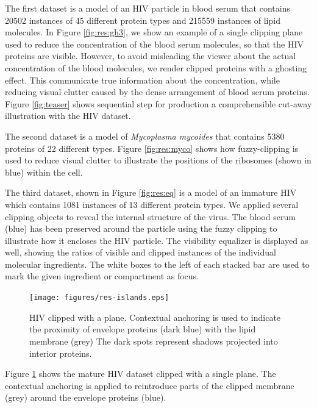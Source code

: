 The first dataset is a model of an HIV particle in blood serum that contains 20502 instances of 45 different protein types and 215559 instances of lipid molecules.
In Figure \ref{fig:res:gh3}, we show an example of a single clipping plane used to reduce the concentration of the blood serum molecules, so that the HIV proteins are visible. 
However, to avoid misleading the viewer about the actual concentration of the blood molecules, we render clipped proteins with a ghosting effect. 
This communicate true information about the concentration, while reducing visual clutter caused by the dense arrangement of blood serum proteins.
Figure \ref{fig:teaser} shows sequential step for production a comprehensible cut-away illustration with the HIV dataset.

The second dataset is a model of \emph{Mycoplasma mycoides} that contains 5380 proteins of 22 different types. 
Figure \ref{fig:res:myco} shows how fuzzy-clipping is used to reduce visual clutter to illustrate the positions of the ribosomes (shown in blue) within the cell.

The third dataset, shown in Figure \ref{fig:res:eq} is a model of an immature HIV which contains 1081 instances of 13 different protein types. 
We applied several clipping objects to reveal the internal structure of the virus. 
The blood serum (blue) has been preserved around the particle using the fuzzy clipping to illustrate how it encloses the HIV particle. 
The visibility equalizer is displayed as well, showing the ratios of visible and clipped instances of the individual molecular ingredients. 
The white boxes to the left of each stacked bar are used to mark the given ingredient or compartment as \mbox{focus}.

\begin{figure}[b]
\vspace{-4mm}
\centering
\texttt{[image: figures/res-islands.eps]}
\caption{\label{fig:res:islands}
HIV clipped with a plane. 
Contextual anchoring is used to indicate the proximity of envelope proteins (dark blue) with the lipid membrane (grey)
The dark spots represent shadows projected into interior proteins.}
\end{figure}

Figure \ref{fig:res:islands} shows the mature HIV dataset clipped with a single plane. 
The contextual anchoring is applied to reintroduce parts of the clipped membrane (grey) around the envelope proteins (blue).


